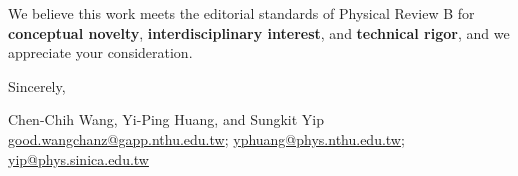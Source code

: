 \documentclass[12pt]{article}
\newcommand{\alert}[1]{{\color{red}#1}}
\begin{document}
We believe this work meets the editorial standards of Physical Review B for \textbf{conceptual novelty}, \textbf{interdisciplinary interest}, and \textbf{technical rigor}, and we appreciate your consideration.


\vfill
\begin{flushleft}
Sincerely,
\bigskip

Chen-Chih Wang, Yi-Ping Huang, and Sungkit Yip \\

\href{mailto:good.wangchanz@gapp.nthu.edu.tw}{good.wangchanz@gapp.nthu.edu.tw}; \href{mailto:yphuang@phys.nthu.edu.tw}{yphuang@phys.nthu.edu.tw}; \href{mailto:yip@phys.sinica.edu.tw}{yip@phys.sinica.edu.tw}
\end{flushleft}






\end{document}
